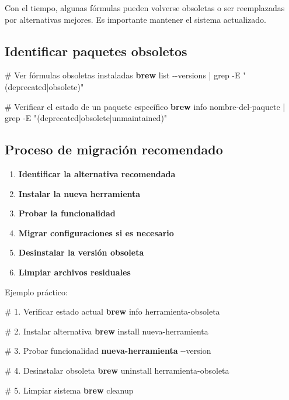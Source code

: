 \documentclass[
  11pt,
  letterpaper,
  oneside,
  openany]{scrbook}
\newenvironment{Shaded}{}{}
\newcommand{\AttributeTok}[1]{\textcolor[rgb]{0.84,0.23,0.29}{#1}}
\newcommand{\CommentTok}[1]{\textcolor[rgb]{0.42,0.45,0.49}{#1}}
\newcommand{\ExtensionTok}[1]{\textcolor[rgb]{0.84,0.23,0.29}{\textbf{#1}}}
\newcommand{\FunctionTok}[1]{\textcolor[rgb]{0.44,0.26,0.76}{#1}}
\newcommand{\KeywordTok}[1]{\textcolor[rgb]{0.84,0.23,0.29}{#1}}
\newcommand{\NormalTok}[1]{\textcolor[rgb]{0.14,0.16,0.18}{#1}}
\newcommand{\StringTok}[1]{\textcolor[rgb]{0.01,0.18,0.38}{#1}}
\providecommand{\tightlist}{%
  \setlength{\itemsep}{0pt}\setlength{\parskip}{0pt}}
\begin{document}
Con el tiempo, algunas fórmulas pueden volverse obsoletas o ser
reemplazadas por alternativas mejores. Es importante mantener el sistema
actualizado.

\subsection{Identificar paquetes
obsoletos}\label{identificar-paquetes-obsoletos}

\begin{Shaded}
\begin{Highlighting}[]
\CommentTok{\# Ver fórmulas obsoletas instaladas}
\ExtensionTok{brew}\NormalTok{ list }\AttributeTok{{-}{-}versions} \KeywordTok{|} \FunctionTok{grep} \AttributeTok{{-}E} \StringTok{"(deprecated|obsolete)"}

\CommentTok{\# Verificar el estado de un paquete específico}
\ExtensionTok{brew}\NormalTok{ info nombre{-}del{-}paquete }\KeywordTok{|} \FunctionTok{grep} \AttributeTok{{-}E} \StringTok{"(deprecated|obsolete|unmaintained)"}
\end{Highlighting}
\end{Shaded}

\subsection{Proceso de migración
recomendado}\label{proceso-de-migraciuxf3n-recomendado}

\begin{enumerate}
\def\labelenumi{\arabic{enumi}.}
\tightlist
\item
  \textbf{Identificar la alternativa recomendada}
\item
  \textbf{Instalar la nueva herramienta}
\item
  \textbf{Probar la funcionalidad}
\item
  \textbf{Migrar configuraciones si es necesario}
\item
  \textbf{Desinstalar la versión obsoleta}
\item
  \textbf{Limpiar archivos residuales}
\end{enumerate}

Ejemplo práctico:

\begin{Shaded}
\begin{Highlighting}[]
\CommentTok{\# 1. Verificar estado actual}
\ExtensionTok{brew}\NormalTok{ info herramienta{-}obsoleta}

\CommentTok{\# 2. Instalar alternativa}
\ExtensionTok{brew}\NormalTok{ install nueva{-}herramienta}

\CommentTok{\# 3. Probar funcionalidad}
\ExtensionTok{nueva{-}herramienta} \AttributeTok{{-}{-}version}

\CommentTok{\# 4. Desinstalar obsoleta}
\ExtensionTok{brew}\NormalTok{ uninstall herramienta{-}obsoleta}

\CommentTok{\# 5. Limpiar sistema}
\ExtensionTok{brew}\NormalTok{ cleanup}
\end{Highlighting}
\end{Shaded}
\end{document}
